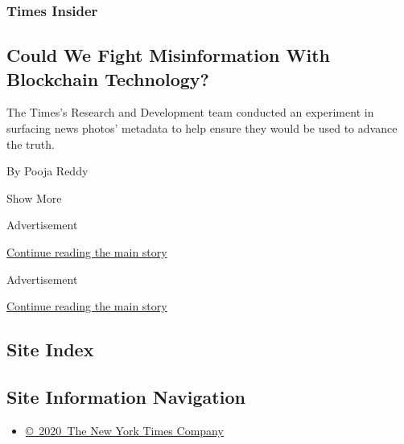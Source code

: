 \begin{enumerate}
  \hypertarget{times-insider-10}{%
  \subsubsection{Times Insider}\label{times-insider-10}}

  \hypertarget{could-we-fight-misinformation-with-blockchain-technology}{%
  \subsection{Could We Fight Misinformation With Blockchain
  Technology?}\label{could-we-fight-misinformation-with-blockchain-technology}}

  The Times's Research and Development team conducted an experiment in
  surfacing news photos' metadata to help ensure they would be used to
  advance the truth.

  By Pooja Reddy
\end{enumerate}

Show More

Advertisement

\protect\hyperlink{after-mid4}{Continue reading the main story}

Advertisement

\protect\hyperlink{after-mktg}{Continue reading the main story}

\hypertarget{site-index}{%
\subsection{Site Index}\label{site-index}}

\hypertarget{site-information-navigation}{%
\subsection{Site Information
Navigation}\label{site-information-navigation}}

\begin{itemize}
\tightlist
\item
  \href{https://help.nytimes.com/hc/en-us/articles/115014792127-Copyright-notice}{©~2020~The
  New York Times Company}
\end{itemize}


